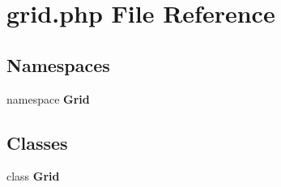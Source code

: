 \section{grid.php File Reference}
\label{src_2grid_8php}
\subsection*{Namespaces}
\begin{CompactItemize}
\item 
namespace {\bf Grid}
\end{CompactItemize}
\subsection*{Classes}
\begin{CompactItemize}
\item 
class {\bf Grid}
\end{CompactItemize}
